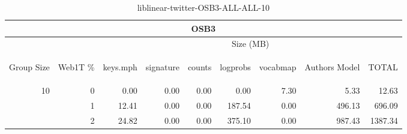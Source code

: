 \begin{center}
\begin{table}[htbp]
\begin{tabular}{ | r | r | r | r | r | r | r | r | r |}
\hline
\multicolumn{9}{|c|}{OSB3}\\
\hline
 & & \multicolumn{7}{|c|}{Size (MB)}\\ \cline{3-9}
\begin{sideways}Group Size\end{sideways} & \begin{sideways}Web1T \% \end{sideways} & \begin{sideways}keys.mph\end{sideways} & \begin{sideways}signature\end{sideways} & \begin{sideways}counts\end{sideways} & \begin{sideways}logprobs\end{sideways} & \begin{sideways}vocabmap\end{sideways} & \begin{sideways}Authors Model \end{sideways} & \begin{sideways}TOTAL\end{sideways}\\
\hline
\multirow{2}{*}{10}
 & 0 & 0.00 & 0.00 & 0.00 & 0.00 & 7.30 & 5.33 & 12.63\\ \cline{2-9}
 & 1 & 12.41 & 0.00 & 0.00 & 187.54 & 0.00 & 496.13 & 696.09\\ \cline{2-9}
 & 2 & 24.82 & 0.00 & 0.00 & 375.10 & 0.00 & 987.43 & 1387.34\\ \cline{2-9}
\hline
\end{tabular}
\caption{liblinear-twitter-OSB3-ALL-ALL-10}
\label{table:liblinear-twitter-OSB3-ALL-ALL-10}
\end{table}
\end{center}

